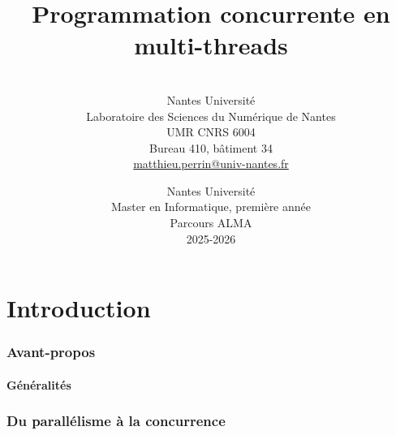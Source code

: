 
\title[Programmation concurrente en multi-threads]{Programmation concurrente en multi-threads}

\author[Matthieu Perrin]{
  \\[2mm]
  Nantes Université\\
  Laboratoire des Sciences du Numérique de Nantes \\
  UMR CNRS 6004\\
  Bureau 410, bâtiment 34 \\
  \url{matthieu.perrin@univ-nantes.fr}\\
}

\date{
  Nantes Université\\
  Master en Informatique, première année\\
  Parcours ALMA\\
  2025-2026
}



\begin{frame}
  \titlepage
\end{frame}

\part{Introduction}

\section{Avant-propos}

\subsection{Généralités}




\section{Du parallélisme à la concurrence}

